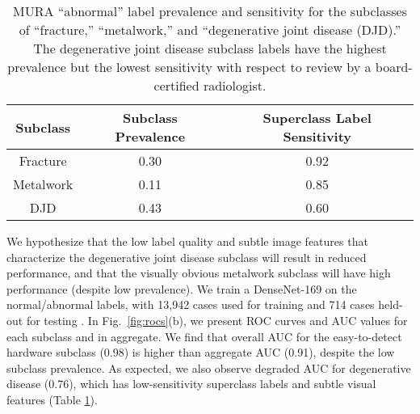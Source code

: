 \documentclass[sigconf,anonymous,review]{acmart}
\begin{document}
\begin{table}[]
\centering
\begin{tabular}{ccc}
 \toprule
 Subclass & Subclass Prevalence & Superclass Label Sensitivity \\
 \toprule
 Fracture & 0.30 & 0.92   \\
 Metalwork & 0.11 & 0.85    \\
 DJD & 0.43 & 0.60 \\
 \toprule
\end{tabular}
\caption{MURA ``abnormal'' label prevalence and sensitivity for the subclasses of ``fracture,'' ``metalwork,'' and ``degenerative joint disease (DJD).'' The degenerative joint disease subclass labels have the highest prevalence but the lowest sensitivity with respect to review by a board-certified radiologist.}
\label{tab:mura2}
\end{table}

We hypothesize that the low label quality and subtle image features that characterize the degenerative joint disease subclass will result in reduced performance, and that the visually obvious metalwork subclass will have high performance (despite low prevalence).
 We train a DenseNet-169 on the normal/abnormal labels, with 13,942 cases used for training and 714 cases held-out for testing \citep{Rajpurkar2017-rc}.  
 In Fig.~\ref{fig:rocs}(b), we present ROC curves and AUC values for each subclass and in aggregate.  
 We find that overall AUC for the easy-to-detect hardware subclass (0.98) is higher than aggregate AUC (0.91), despite the low subclass prevalence.
 As expected, we also observe degraded AUC for degenerative disease (0.76), which has low-sensitivity superclass labels and subtle visual features (Table \ref{tab:mura2}).  
\end{document}

